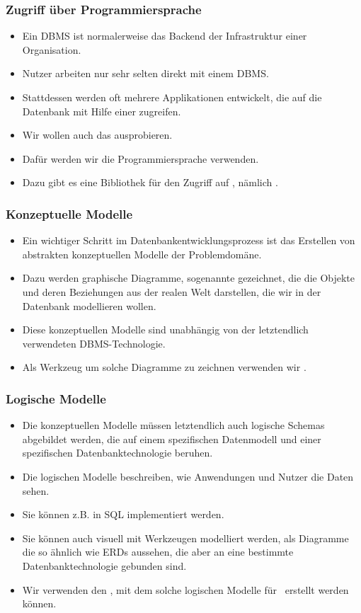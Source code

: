 \documentclass[aspectratio=169,mathserif,notheorems]{beamer}%
\begin{document}
%
\begin{frame}[b]%
\frametitle{Zugriff über Programmiersprache}%
\begin{itemize}%
\item Ein DBMS ist normalerweise das Backend der Infrastruktur einer Organisation.%
\item<2-> Nutzer arbeiten nur sehr selten direkt mit einem DBMS.%
\item<3-> Stattdessen werden oft mehrere Applikationen entwickelt, die auf die Datenbank mit Hilfe einer  zugreifen.%
\item<4-> Wir wollen auch das ausprobieren.%
\item<5-> Dafür werden wir die Programmiersprache \python\cite{K2018EIPFEUU,A2002PC,H2023ABGTP3P,LH2015DSAAWP,programmingWithPython} verwenden.%
\item<6-> Dazu gibt es eine Bibliothek für den Zugriff auf \postgresql, nämlich \psycopg\cite{VDGE2010P}.%
\end{itemize}%
%
%
\end{frame}%
%
\begin{frame}%
\frametitle{Konzeptuelle Modelle}%
\begin{itemize}%
\item Ein wichtiger Schritt im Datenbankentwicklungsprozess ist das Erstellen von abstrakten konzeptuellen Modelle der Problemdomäne.%
\item<2-> Dazu werden graphische Diagramme, sogenannte  gezeichnet, die die Objekte und deren Beziehungen aus der realen Welt darstellen, die wir in der Datenbank modellieren wollen.%
\item<3-> Diese konzeptuellen Modelle sind unabhängig von der letztendlich verwendeten DBMS-Technologie.%
\item<4-> Als Werkzeug um solche Diagramme zu zeichnen verwenden wir \yEd\cite{SG2015MDAWY,Y2011YGEM}.%
\end{itemize}%
\end{frame}%
%
\begin{frame}%
\frametitle{Logische Modelle}%
\begin{itemize}%
\item Die konzeptuellen Modelle müssen letztendlich auch logische Schemas abgebildet werden, die auf einem spezifischen Datenmodell und einer spezifischen Datenbanktechnologie beruhen.%
\item<2-> Die logischen Modelle beschreiben, wie Anwendungen und Nutzer die Daten sehen.%
\item<3-> Sie können z.B. in SQL implementiert werden.%
\item<4-> Sie können auch visuell mit Werkzeugen modelliert werden, als Diagramme die so ähnlich wie ERDs aussehen, die aber an eine bestimmte Datenbanktechnologie gebunden sind.%
\item<5-> Wir verwenden den \pgmodeler\cite{AES2006PPDM}, mit dem solche logischen Modelle für \postgresql\ erstellt werden können.%
\end{itemize}%
\end{frame}%
\end{document}
